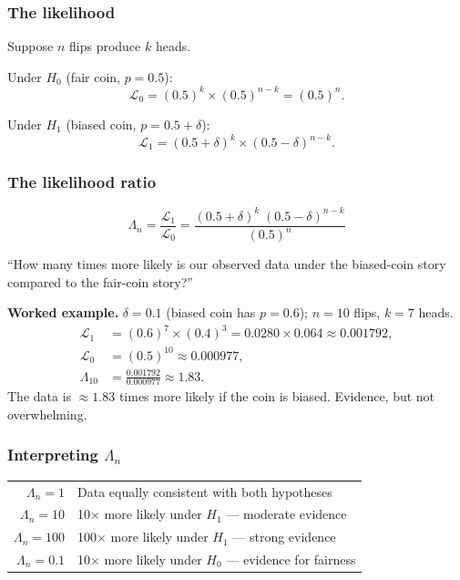 \documentclass[12pt, a4paper]{article}
\newcommand{\LR}{\Lambda}              %
\begin{document}
\subsubsection*{The likelihood}

Suppose $n$ flips produce $k$ heads.

Under $H_0$ (fair coin, $p = 0.5$):
\[
  \mathcal{L}_0
  = (0.5)^k \times (0.5)^{n-k}
  = (0.5)^n.
\]

Under $H_1$ (biased coin, $p = 0.5 + \delta$):
\[
  \mathcal{L}_1
  = (0.5 + \delta)^k \times (0.5 - \delta)^{n-k}.
\]

\subsubsection*{The likelihood ratio}

\[
  \boxed{\LR_n
  = \frac{\mathcal{L}_1}{\mathcal{L}_0}
  = \frac{(0.5+\delta)^k \;(0.5-\delta)^{n-k}}{(0.5)^n}}
\]

\begin{plainlanguage}
``How many times more likely is our observed data under the biased-coin story
compared to the fair-coin story?''
\end{plainlanguage}

\textbf{Worked example.}
$\delta = 0.1$ (biased coin has $p=0.6$); $n=10$ flips, $k=7$ heads.
\begin{align*}
  \mathcal{L}_1 &= (0.6)^7 \times (0.4)^3 = 0.0280 \times 0.064 \approx 0.001792, \\
  \mathcal{L}_0 &= (0.5)^{10} \approx 0.000977, \\
  \LR_{10} &= \frac{0.001792}{0.000977} \approx 1.83.
\end{align*}
The data is $\approx\!1.83$ times more likely if the coin is biased.
Evidence, but not overwhelming.

\subsubsection*{Interpreting $\LR_n$}

\begin{center}
\begin{tabular}{@{} r l @{}}
\toprule
$\LR_n = 1$   & Data equally consistent with both hypotheses \\
$\LR_n = 10$  & 10$\times$ more likely under $H_1$ --- moderate evidence \\
$\LR_n = 100$ & 100$\times$ more likely under $H_1$ --- strong evidence \\
$\LR_n = 0.1$ & 10$\times$ more likely under $H_0$ --- evidence for fairness \\
\bottomrule
\end{tabular}
\end{center}
\end{document}

